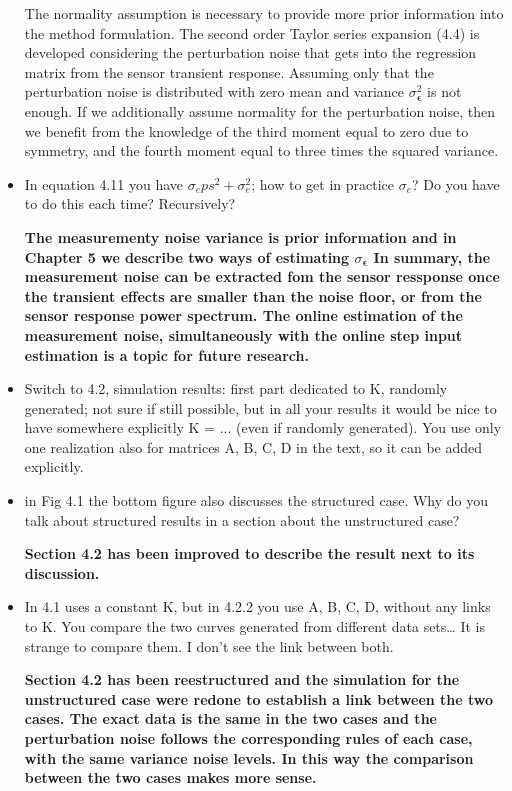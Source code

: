\documentclass[11pt]{article}
\begin{document}
\begin{itemize}
	\color{blue}
	The normality assumption is necessary to provide more prior information into the method formulation.
    The second order Taylor series expansion (4.4) is developed considering the perturbation noise that gets into the regression matrix from the sensor transient response.
    Assuming only that the perturbation noise is distributed with zero mean and variance $\sigma_{\bm{\epsilon}}^2$ is not enough.
    If we additionally assume normality for the perturbation noise, then we benefit from the knowledge of the third moment equal to zero due to symmetry, and the fourth moment equal to three times the squared variance\color{black}.
	
	\item   In equation 4.11 you have $\sigma_eps^2 + \sigma_e^2$; how to get in practice $\sigma_e$? Do you have to do this each time? Recursively?
	
	{\bfseries The measurementy noise variance is prior information and in Chapter 5 we describe two ways of estimating $\sigma_{\bm{\epsilon}}$ In summary, the measurement noise can be extracted fom the sensor ressponse once the transient effects are smaller than the noise floor, or from the sensor response power spectrum. The online estimation of the measurement noise, simultaneously with the online step input estimation is a topic for future research.   }
	
	
	\item   Switch to 4.2, simulation results: first part dedicated to K, randomly generated; not sure if still possible, but in all your results it would be nice to have somewhere explicitly K = ... (even if randomly generated). You use only one realization also for matrices A, B, C, D in the text, so it can be added explicitly.
	\item   in Fig 4.1 the bottom figure also discusses the structured case. Why do you talk about structured results in a section about the unstructured case?
	
	{\bfseries Section 4.2 has been improved to describe the result next to its discussion.  }
	
	\item   In 4.1 uses a constant K, but in 4.2.2 you use A, B, C, D, without any links to K. You compare the two curves generated from different data sets… It is strange to compare them. I don't see the link between both.
	
	{\bfseries Section 4.2 has been reestructured and the simulation for the unstructured case were redone to establish a link between the two cases. The exact data is the same in the two cases and the perturbation noise follows the corresponding rules of each case, with the same variance noise levels. In this way the comparison between the two cases makes more sense.  }
	

\end{itemize}
\end{document}
